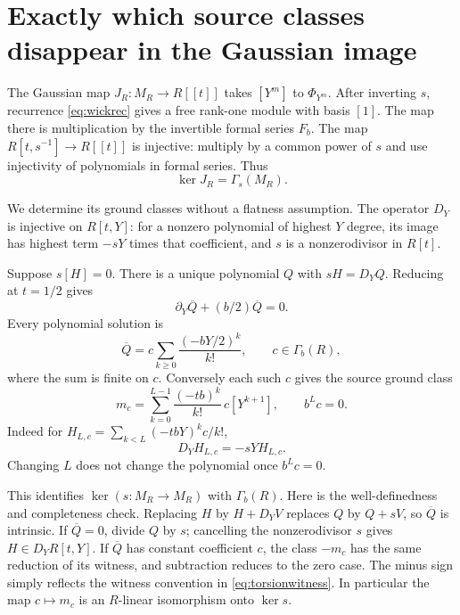 \documentclass[11pt]{article}
\theoremstyle{definition}\newtheorem{definition}[theorem]{Definition}
\theoremstyle{remark}\newtheorem{remark}[theorem]{Remark}
\begin{document}
\section{Exactly which source classes disappear in the Gaussian image}

The Gaussian map $J_R:M_R\to R[[t]]$ takes $[Y^m]$ to
$\Phi_{Y^m}$. After inverting $s$, recurrence
\eqref{eq:wickrec} gives a free rank-one module with basis $[1]$.
The map there is multiplication by the invertible formal series
$F_b$. The map $R[t,s^{-1}]\to R[[t]]$ is injective: multiply by
a common power of $s$ and use injectivity of polynomials in formal
series. Thus
\begin{equation}\label{eq:kernel}
 \ker J_R=\Gamma_s(M_R).
\end{equation}

We determine its ground classes without a flatness assumption.
The operator $D_Y$ is injective on $R[t,Y]$: for a nonzero
polynomial of highest $Y$ degree, its image has highest term
$-sY$ times that coefficient, and $s$ is a nonzerodivisor in
$R[t]$.

Suppose $s[H]=0$. There is a unique polynomial $Q$ with
$sH=D_YQ$. Reducing at $t=1/2$ gives
\[
 \partial_Y\overline Q+(b/2)\overline Q=0.
\]
Every polynomial solution is
\[
 \overline Q=c\sum_{k\ge0}\frac{(-bY/2)^k}{k!},
 \qquad c\in\Gamma_b(R),
\]
where the sum is finite on $c$. Conversely each such $c$ gives
the source ground class
\begin{equation}\label{eq:ground}
 m_c=\sum_{k=0}^{L-1}\frac{(-tb)^k}{k!}\,c[Y^{k+1}],
                  \qquad b^Lc=0.
\end{equation}
Indeed for $H_{L,c}=\sum_{k<L}(-tbY)^kc/k!$,
\begin{equation}\label{eq:torsionwitness}
 D_YH_{L,c}=-sYH_{L,c}.
\end{equation}
Changing $L$ does not change the polynomial once $b^Lc=0$.

This identifies $\ker(s:M_R\to M_R)$ with $\Gamma_b(R)$.
Here is the well-definedness and completeness check. Replacing
$H$ by $H+D_YV$ replaces $Q$ by $Q+sV$, so $\overline Q$
is intrinsic. If $\overline Q=0$, divide $Q$ by $s$; cancelling
the nonzerodivisor $s$ gives $H\in D_YR[t,Y]$. If
$\overline Q$ has constant coefficient $c$, the class $-m_c$
has the same reduction of its witness, and subtraction reduces
to the zero case. The minus sign simply reflects the witness
convention in \eqref{eq:torsionwitness}. In particular the map
$c\mapsto m_c$ is an $R$-linear isomorphism onto $\ker s$.
\end{document}
